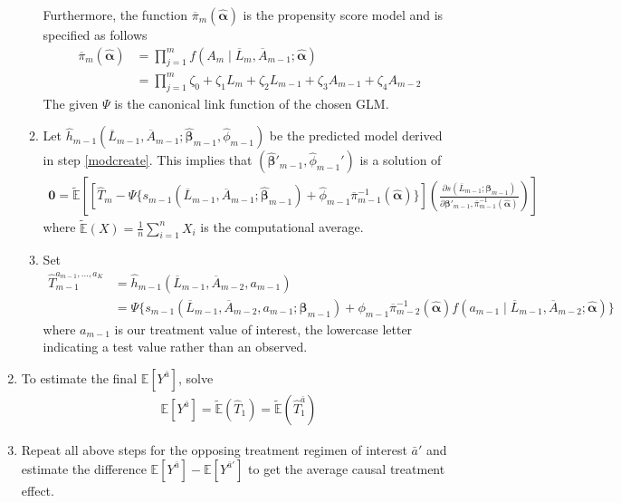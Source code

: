 \begin{enumerate}
\begin{enumerate}
Furthermore, the function $\overline{\pi}_m(\hat{\mathbf{\alpha}})$ is the propensity score model and is specified as follows
\begin{align} 
\overline{\pi}_m(\hat{\mathbf{\alpha}}) &= \prod_{j=1}^m f(A_m \mid \overline{L}_m, \overline{A}_{m-1}; \hat{\mathbf{\alpha}}) \\
&= \prod_{j=1}^m \zeta_0 + \zeta_1 L_m + \zeta_2 L_{m-1} + \zeta_3 A_{m-1} + \zeta_4 A_{m-2}
\end{align}
The given $\Psi$ is the canonical link function of the chosen GLM.  

\item Let $ \hat{h}_{m-1}(\overline{L}_{m-1}, \overline{A}_{m-1}; \hat{\mathbf{\beta}}_{m-1}, \hat{\phi}_{m-1})$ be the predicted model derived in step \ref{modcreate}.  This implies that $(\hat{\mathbf{\beta}}'_{m-1}, \hat{\phi}_{m-1}')$ is a solution of 
\begin{align}
\mathbf{0} = \tilde{\mathbb{E}} \left[ \left[\hat{T}_{m} - \Psi \{ s_{m-1}(\overline{L}_{m-1}, \overline{A}_{m-1}; \hat{\mathbf{\beta}}_{m-1}) + \hat{\phi}_{m-1} \overline{\pi}^{-1}_{m-1}(\hat{\mathbf{\alpha}}) \} \right] \left( \frac{\partial s (\overline{L}_{m-1}; \mathbf{\beta}_{m-1})}{\partial \mathbf{\beta}'_{m-1}, \overline{\pi}^{-1}_{m-1}(\hat{\mathbf{\alpha}})} \right) \right]
\end{align}
where $\tilde{\mathbb{E}}(X) = \frac{1}{n} \sum_{i=1}^n X_i$ is the computational average.  

\item \label{stepc} Set 
\begin{align} 
\hat{T}_{m-1}^{a_{m-1}, \dots, a_K} &= \hat{h}_{m-1}(\overline{L}_{m-1}, \overline{A}_{m-2}, a_{m-1}) \\
&=  \Psi \{s_{m-1}(\overline{L}_{m-1}, \overline{A}_{m-2}, a_{m-1}; \mathbf{\beta}_{m-1}) + \phi_{m-1} \overline{\pi}_{m-2}^{-1} (\hat{\mathbf{\alpha}}) f(a_{m-1} \mid \overline{L}_{m-1}, \overline{A}_{m-2}; \hat{\mathbf{\alpha}}) \}
\end{align} 
where $a_{m-1}$ is our treatment value of interest, the lowercase letter indicating a test value rather than an observed.  
\end{enumerate}

\item To estimate the final $\mathbb{E}[Y^{\bar{a}}]$, solve 
\begin{align} 
\mathbb{E}[Y^{\bar{a}}] = \tilde{\mathbb{E}}(\hat{T}_1) = \tilde{\mathbb{E}}(\hat{T}_1^{\bar{a}})
\end{align}

\item Repeat all above steps for the opposing treatment regimen of interest $\bar{a}'$ and estimate the difference $\mathbb{E}[Y^{\bar{a}}] - \mathbb{E}[Y^{\bar{a}'}]$ to get the average causal treatment effect.  
\end{enumerate}

